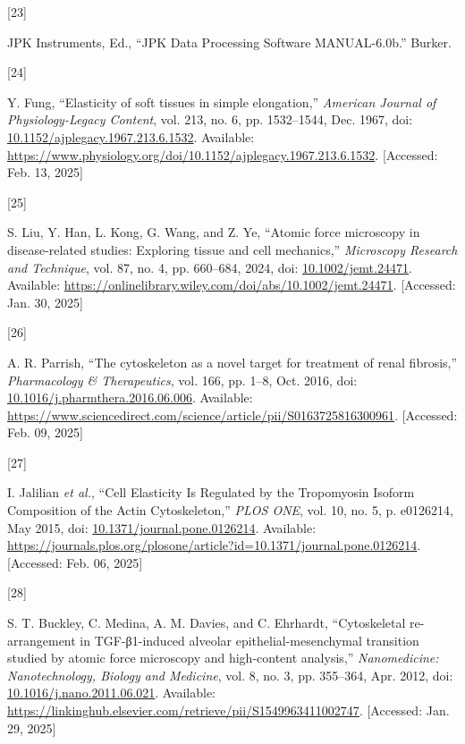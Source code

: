 \documentclass[
  paper=a4,
  ,captions=tableheading
]{scrartcl}
\newlength{\cslhangindent}
\newlength{\csllabelwidth}
\newenvironment{CSLReferences}[2] %
  {\begin{list}{}{%
   \setlength{\itemindent}{0pt}
   \setlength{\leftmargin}{0pt}
   \setlength{\parsep}{0pt}
   \ifodd #1
    \setlength{\leftmargin}{\cslhangindent}
    \setlength{\itemindent}{-1\cslhangindent}
   \fi
   \setlength{\itemsep}{#2\baselineskip}}}
  {\end{list}}
\newcommand{\CSLLeftMargin}[1]{\parbox[t]{\csllabelwidth}{\strut#1\strut}}
\newcommand{\CSLRightInline}[1]{\parbox[t]{\linewidth - \csllabelwidth}{\strut#1\strut}}
\begin{document}
\begin{CSLReferences}{0}{0}
\CSLLeftMargin{{[}23{]} }%
\CSLRightInline{JPK Instruments, Ed., {``{JPK Data Processing Software
MANUAL-6}.0b.''} Burker.}

\CSLLeftMargin{{[}24{]} }%
\CSLRightInline{Y. Fung, {``Elasticity of soft tissues in simple
elongation,''} \emph{American Journal of Physiology-Legacy Content},
vol. 213, no. 6, pp. 1532--1544, Dec. 1967, doi:
\href{https://doi.org/10.1152/ajplegacy.1967.213.6.1532}{10.1152/ajplegacy.1967.213.6.1532}.
Available:
\url{https://www.physiology.org/doi/10.1152/ajplegacy.1967.213.6.1532}.
{[}Accessed: Feb. 13, 2025{]}}

\CSLLeftMargin{{[}25{]} }%
\CSLRightInline{S. Liu, Y. Han, L. Kong, G. Wang, and Z. Ye, {``Atomic
force microscopy in disease-related studies: {Exploring} tissue and cell
mechanics,''} \emph{Microscopy Research and Technique}, vol. 87, no. 4,
pp. 660--684, 2024, doi:
\href{https://doi.org/10.1002/jemt.24471}{10.1002/jemt.24471}.
Available:
\url{https://onlinelibrary.wiley.com/doi/abs/10.1002/jemt.24471}.
{[}Accessed: Jan. 30, 2025{]}}

\CSLLeftMargin{{[}26{]} }%
\CSLRightInline{A. R. Parrish, {``The cytoskeleton as a novel target for
treatment of renal fibrosis,''} \emph{Pharmacology \& Therapeutics},
vol. 166, pp. 1--8, Oct. 2016, doi:
\href{https://doi.org/10.1016/j.pharmthera.2016.06.006}{10.1016/j.pharmthera.2016.06.006}.
Available:
\url{https://www.sciencedirect.com/science/article/pii/S0163725816300961}.
{[}Accessed: Feb. 09, 2025{]}}

\CSLLeftMargin{{[}27{]} }%
\CSLRightInline{I. Jalilian \emph{et al.}, {``Cell {Elasticity Is
Regulated} by the {Tropomyosin Isoform Composition} of the {Actin
Cytoskeleton},''} \emph{PLOS ONE}, vol. 10, no. 5, p. e0126214, May
2015, doi:
\href{https://doi.org/10.1371/journal.pone.0126214}{10.1371/journal.pone.0126214}.
Available:
\url{https://journals.plos.org/plosone/article?id=10.1371/journal.pone.0126214}.
{[}Accessed: Feb. 06, 2025{]}}

\CSLLeftMargin{{[}28{]} }%
\CSLRightInline{S. T. Buckley, C. Medina, A. M. Davies, and C. Ehrhardt,
{``Cytoskeletal re-arrangement in {TGF-β1-induced} alveolar
epithelial-mesenchymal transition studied by atomic force microscopy and
high-content analysis,''} \emph{Nanomedicine: Nanotechnology, Biology
and Medicine}, vol. 8, no. 3, pp. 355--364, Apr. 2012, doi:
\href{https://doi.org/10.1016/j.nano.2011.06.021}{10.1016/j.nano.2011.06.021}.
Available:
\url{https://linkinghub.elsevier.com/retrieve/pii/S1549963411002747}.
{[}Accessed: Jan. 29, 2025{]}}


\end{CSLReferences}
\end{document}
